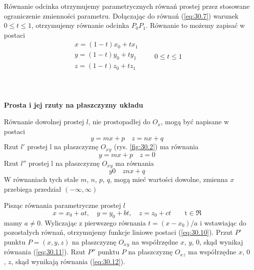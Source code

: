 \begin{odcinek}
Równanie odcinka otrzymujemy parametrycznych równań prostej przez stosowane ograniczenie zmienności parametru. Dołączając do równań (\ref{eq:30.7}) warunek $0\leq t \leq1$, otrzymujemy równanie odcinka $P_0P_1$. Równanie to możemy zapisać w postaci
\begin{equation}
	\begin{matrix}
	x = (1-t)x_0 + tx_1\\
	y = (1-t)y_0 + ty_1\\
	z = (1-t)z_0 + tz_1\\
	\end{matrix}
	\qquad	0 \leq t \leq 1
	\label{eq:30.9}
\end{equation}
\end{odcinek}
\\ \\
\textbf{Prosta i jej rzuty na płaszczyzny układu}\\
\begin{pkt}{30.3}
Równanie dowolnej prostej $l$, nie prostopadłej do $O_x$, mogą być napisane w postaci
\begin{equation}
	y = mx + p \quad z = nx + q
	\label{eq:30.10}
\end{equation}
Rzut $l'$ prostej l na płaszczyznę $O_x$$_y$ (rys. \ref{fig:30.2}) ma równania
\begin{equation}
	y = mx + p \quad z = 0
	\label{eq:30.11}
\end{equation}
Rzut $l''$ prostej l na płaszczyznę $O_x$$_y$ ma równania
\begin{equation}
	y 0 \quad z nx + q
	\label{eq:30.12}
\end{equation}
W równaniach tych stałe $m$, $n$, $p$, $q$, mogą mieć wartości dowolne, zmienna $x$ przebiega przedział $(-\infty, \infty)$
\end{pkt}

\begin{dowod}
Pisząc równania parametryczne prostej $l$
\begin{equation}
	x = x_0 + at, \quad y=y_0 + bt, \quad z=z_0 + ct \qquad	\textrm{t} \in \Re
	\label{eq:30.13}
\end{equation}
mamy $a\neq0$. Wyliczając z pierwszego równania $t=(x-x_0)/a$ i wstawiając do pozostałych równań, otrzymujemy funkcje liniowe postaci (\ref{eq:30.10}). Przut $P'$ punktu $P=(x,y,z)$ na płaszczyznę $O_x$$_y$ na współrzędne $x$, $y$, $0$, skąd wynikaj równania (\ref{eq:30.11}). Rzut $P''$ punktu $P$ na płaszczyznę $O_x$$_z$ ma współrzędne $x$, $0$, $z$, skąd wynikają równania (\ref{eq:30.12}).
\end{dowod}

